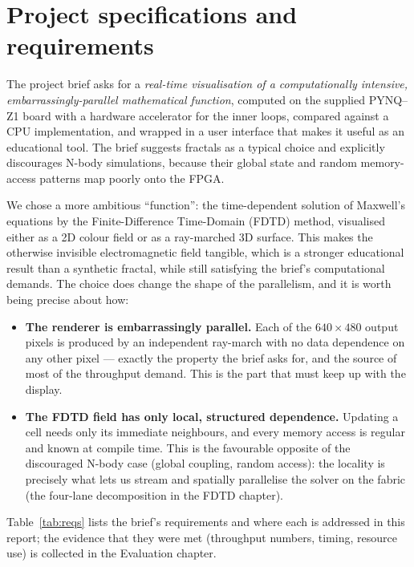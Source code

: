 \documentclass[11pt]{report}
\begin{document}
\section{Project specifications and requirements}

The project brief asks for a \emph{real-time visualisation of a computationally
intensive, embarrassingly-parallel mathematical function}, computed on the
supplied PYNQ--Z1 board with a hardware accelerator for the inner loops, compared
against a CPU implementation, and wrapped in a user interface that makes it
useful as an educational tool. The brief suggests fractals as a typical choice
and explicitly discourages N-body simulations, because their global state and
random memory-access patterns map poorly onto the FPGA.

We chose a more ambitious ``function'': the time-dependent solution of Maxwell's
equations by the Finite-Difference Time-Domain (FDTD) method, visualised either
as a 2D colour field or as a ray-marched 3D surface. This makes the otherwise
invisible electromagnetic field tangible, which is a stronger educational result
than a synthetic fractal, while still satisfying the brief's computational
demands. The choice does change the shape of the parallelism, and it is worth
being precise about how:

\begin{itemize}
  \item \textbf{The renderer is embarrassingly parallel.} Each of the
  $640\times480$ output pixels is produced by an independent ray-march with no
  data dependence on any other pixel --- exactly the property the brief asks
  for, and the source of most of the throughput demand. This is the part that
  must keep up with the display.
  \item \textbf{The FDTD field has only local, structured dependence.} Updating a
  cell needs only its immediate neighbours, and every memory access is regular
  and known at compile time. This is the favourable opposite of the discouraged
  N-body case (global coupling, random access): the locality is precisely what
  lets us stream and spatially parallelise the solver on the fabric (the
  four-lane decomposition in the FDTD chapter).
\end{itemize}

Table~\ref{tab:reqs} lists the brief's requirements and where each is addressed
in this report; the evidence that they were met (throughput numbers, timing,
resource use) is collected in the Evaluation chapter.
\end{document}
